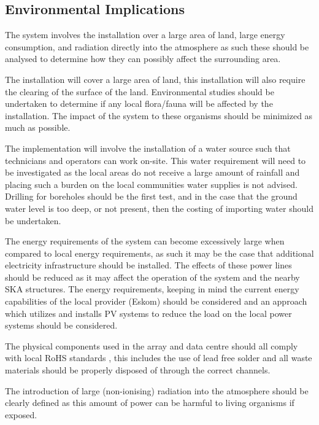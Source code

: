 \documentclass[11pt]{witseiepaper}
\begin{document}
\begin{bibunit}[witseie]


\subsection{Environmental Implications} \label{sec:EnvironmentalImplications}
The system involves the installation over a large area of land, large energy consumption, and radiation directly into the atmosphere as such these should be analysed to determine how they can possibly affect the surrounding area.

The installation will cover a large area of land, this installation will also require the clearing of the surface of the land. Environmental studies should be undertaken to determine if any local flora/fauna will be affected by the installation. The impact of the system to these organisms should be minimized as much as possible.

The implementation will involve the installation of a water source such that technicians and operators can work on-site. This water requirement will need to be investigated as the local areas do not receive a large amount of rainfall and placing such a burden on the local communities water supplies is not advised. Drilling for boreholes should be the first test, and in the case that the ground water level is too deep, or not present, then the costing of importing water should be undertaken.

The energy requirements of the system can become excessively large when compared to local energy requirements, as such it may be the case that additional electricity infrastructure should be installed. The effects of these power lines should be reduced as it may affect the operation of the system and the nearby SKA structures. The energy requirements, keeping in mind the current energy capabilities of the local provider (Eskom) should be considered and an approach which utilizes and installs PV systems to reduce the load on the local power systems should be considered.


The physical components used in the array and data centre should all comply with local RoHS standards \cite{RoHS}, this includes the use of lead free solder and all waste materials should be properly disposed of through the correct channels.

The introduction of large (non-ionising) radiation into the atmosphere should be clearly defined as this amount of power can be harmful to living organisms if exposed.



\end{bibunit}
\end{document}
